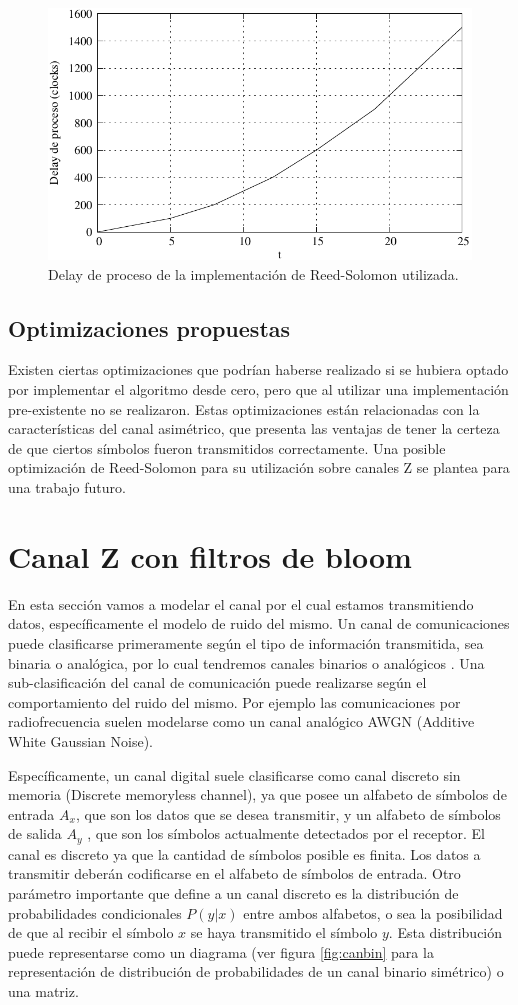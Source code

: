 \begin{figure}[t]
  \centering
  \includegraphics[width=0.6 \textwidth]{graphs/rsDelay.pdf} 
  \caption{Delay de proceso de la implementación de Reed-Solomon utilizada.}
  \label{fig_rslat}
\end{figure}


\subsection{Optimizaciones propuestas}
 
Existen ciertas optimizaciones que podrían haberse realizado si se hubiera optado por implementar el algoritmo desde cero, pero que al utilizar una implementación pre-existente no se realizaron. Estas optimizaciones están relacionadas con la características del canal asimétrico, que presenta las ventajas de tener la certeza de que ciertos símbolos fueron transmitidos correctamente. Una posible optimización de Reed-Solomon para su utilización sobre canales Z se plantea para una trabajo futuro.

\section{Canal Z con filtros de bloom}

En esta sección vamos a modelar el canal por el cual estamos transmitiendo datos, específicamente el modelo de ruido del mismo. 
Un canal de comunicaciones puede clasificarse primeramente según el tipo de información transmitida, sea binaria o analógica, por lo cual tendremos canales binarios o analógicos \cite{MacKay:2002}.
Una sub-clasificación del canal de comunicación puede realizarse según el comportamiento del ruido del mismo.
Por ejemplo las comunicaciones por radiofrecuencia suelen modelarse como un canal analógico AWGN (Additive White Gaussian Noise). 

Específicamente, un canal digital suele clasificarse como canal discreto sin memoria (Discrete memoryless channel), ya que posee un alfabeto de símbolos de entrada $A_{x}$, que son los datos que se desea transmitir, y un alfabeto de símbolos de salida $A_{y}$ , que son los símbolos actualmente detectados por el receptor. El canal es discreto ya que la cantidad de símbolos posible es finita. Los datos a transmitir deberán codificarse en el alfabeto de símbolos de entrada.
Otro parámetro importante que define a un canal discreto es la distribución de probabilidades condicionales $P(y|x)$ entre ambos alfabetos, o sea la posibilidad de que al recibir el símbolo $x$ se haya transmitido el símbolo $y$. Esta distribución puede representarse como un diagrama (ver figura \ref{fig:canbin} para la representación de distribución de probabilidades de un canal binario simétrico) o una matriz.

